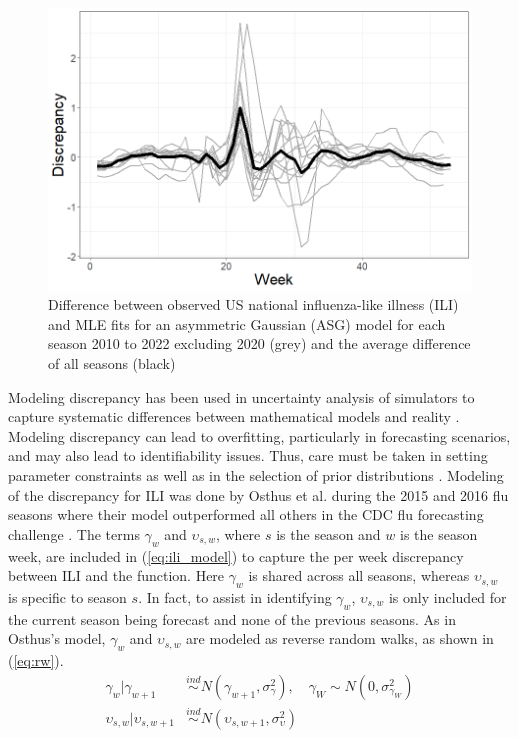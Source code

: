 \begin{figure}[hbt!]
    \centering
    \includegraphics[scale=.45]{Images/discrepancy.png}
    \caption{Difference between observed US national influenza-like illness 
    (ILI) and MLE fits for an asymmetric Gaussian (ASG) model for each season 
    2010 to 2022 excluding 2020 (grey) and the average difference of all 
    seasons (black)}
    \label{fig:discrepancy}
\end{figure}

Modeling discrepancy has been used in uncertainty analysis of 
simulators to capture systematic differences between mathematical models and 
reality \cite[]{ma2022multifidelity,brynjarsdottir2014learning,
arendt2012improving,kennedy2001bayesian}. Modeling discrepancy can lead to 
overfitting, particularly in forecasting scenarios, and may also lead to 
identifiability issues. 
Thus, care must be taken in setting parameter constraints as well as in the 
selection of prior distributions \cite[]{osthus2019dynamic,
brynjarsdottir2014learning}. 
Modeling of the discrepancy for ILI was done by Osthus et al. during the 2015 
and 2016 flu seasons where their model outperformed all others in the CDC flu 
forecasting challenge \cite[]{osthus2019dynamic}.
The terms $\gamma_w$ and $\upsilon_{s,w}$, where $s$ is the season and $w$ is the 
season week, are included in 
(\ref{eq:ili_model}) to capture the per week discrepancy between ILI and the 
function. Here $\gamma_w$ is shared across all seasons, whereas $\upsilon_{s,w}$
is specific to season $s$. In fact, to assist in identifying $\gamma_w$,
$\upsilon_{s,w}$ is only included for the current season being forecast and none of
the previous seasons.
 As in Osthus's model, 
$\gamma_w$ and $\upsilon_{s,w}$ are modeled as reverse random walks, as shown 
in (\ref{eq:rw}). 
\begin{equation}
    \begin{aligned}
    \label{eq:rw}
        \gamma_w|\gamma_{w + 1} &\overset{ind}{\sim} N(\gamma_{w+1},\sigma^2_{\gamma}), \quad
        \gamma_{W} \sim N(0,\sigma^2_{\gamma_W}) \\
        \upsilon_{s,w}|\upsilon_{s, w + 1} &\overset{ind}{\sim} N(\upsilon_{s, w+1},\sigma^2_{\upsilon})
    \end{aligned}
\end{equation}


